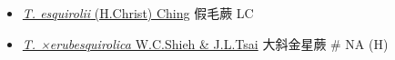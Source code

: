 \begin{itemize}
  \begin{itemize}
        \item[] \href{http://www.theplantlist.org/tpl1.1/search?q=Thelypteris+esquirolii}{\textit{T. esquirolii} (H.Christ) Ching}   假毛蕨   LC
        \item[] \href{http://www.theplantlist.org/tpl1.1/search?q=Thelypteris+×erubesquirolica}{\textit{T. ×erubesquirolica} W.C.Shieh \& J.L.Tsai}   大斜金星蕨  \# NA (H)
  \end{itemize}
  \end{itemize}
